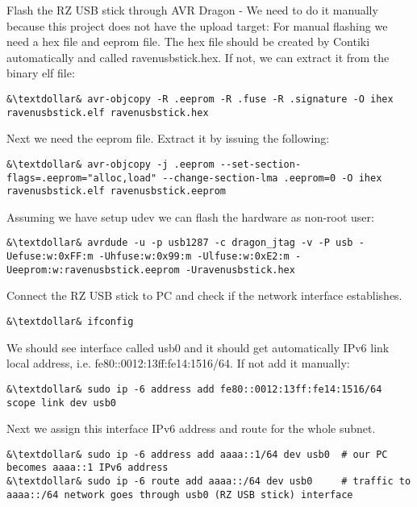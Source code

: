 \documentclass{article}
\begin{document}
Flash the RZ USB stick through AVR Dragon - We need to do it manually because this project does not have the upload target:
For manual flashing we need a hex file and eeprom file. The hex file should be created by Contiki automatically and called ravenusbstick.hex.
If not, we can extract it from the binary elf file:
\begin{lstlisting}
&\textdollar& avr-objcopy -R .eeprom -R .fuse -R .signature -O ihex ravenusbstick.elf ravenusbstick.hex
\end{lstlisting}
Next we need the eeprom file. Extract it by issuing the following:
\begin{lstlisting}
&\textdollar& avr-objcopy -j .eeprom --set-section-flags=.eeprom="alloc,load" --change-section-lma .eeprom=0 -O ihex ravenusbstick.elf ravenusbstick.eeprom
\end{lstlisting}
Assuming we have setup udev we can flash the hardware as non-root user:
\begin{lstlisting}
&\textdollar& avrdude -u -p usb1287 -c dragon_jtag -v -P usb -Uefuse:w:0xFF:m -Uhfuse:w:0x99:m -Ulfuse:w:0xE2:m -Ueeprom:w:ravenusbstick.eeprom -Uravenusbstick.hex
\end{lstlisting}

Connect the RZ USB stick to PC and check if the network interface establishes.
\begin{lstlisting}
&\textdollar& ifconfig
\end{lstlisting}

We should see interface called usb0 and it should get automatically IPv6 link local address, i.e. fe80::0012:13ff:fe14:1516/64.
If not add it manually:
\begin{lstlisting}
&\textdollar& sudo ip -6 address add fe80::0012:13ff:fe14:1516/64 scope link dev usb0
\end{lstlisting}
Next we assign this interface IPv6 address and route for the whole subnet.
\begin{lstlisting}
&\textdollar& sudo ip -6 address add aaaa::1/64 dev usb0  # our PC becomes aaaa::1 IPv6 address
&\textdollar& sudo ip -6 route add aaaa::/64 dev usb0     # traffic to aaaa::/64 network goes through usb0 (RZ USB stick) interface
\end{lstlisting}
\end{document}
